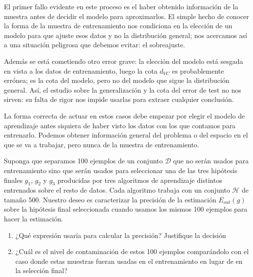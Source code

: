 \documentclass[a4paper, 11pt]{article}
\begin{document}
\begin{solucion}
      \begin{solucion}
        El primer fallo evidente en este proceso es el haber obtenido información de la muestra antes de decidir el modelo para aproximarlos. El simple hecho de conocer la forma de la muestra de entrenamiento nos condiciona en la elección de un modelo para que ajuste esos datos y no la distribución general; nos acercamos así a una situación peligrosa que debemos evitar: el sobreajuste.

        Además se está cometiendo otro error grave: la elección del modelo está sesgada en vista a los datos de entrenamiento, luego la cota $d_{VC}$ es probablemente errónea; es la cota del modelo, pero no del modelo que sigue la distribución general. Así, el estudio sobre la generalización y la cota del error de test no nos sirven: su falta de rigor nos impide usarlas para extraer cualquier conclusión.

        La forma correcta de actuar en estos casos debe empezar por elegir el modelo de aprendizaje antes siquiera de haber visto los datos con los que contamos para entrenarlo. Podemos obtener información general del problema o del espacio en el que se va a trabajar, pero nunca de la muestra de entrenamiento.
      \end{solucion}

      \begin{ejercicio}
          Suponga que separamos 100 ejemplos de un conjunto $\mathcal{D}$ que no serán usados para entrenamiento sino que serán usados para seleccionar una de las tres hipótesis finales $g_1$, $g_2$ y $g_3$ producidas por tres algoritmos de aprendizaje distintos entrenados sobre el resto de datos. Cada algoritmo trabaja con un conjunto $\mathcal{H}$ de tamaño 500. Nuestro deseo es caracterizar la precisión de la estimación $E_{out}(g)$ sobre la hipótesis final seleccionada cuando usamos los mismos 100 ejemplos para hacer la estimación.
          \begin{enumerate}
          \item ¿Qué expresión usaría para calcular la precisión? Justifique la decisión
          \item ¿Cuál es el nivel de contaminación de estos 100 ejemplos comparándolo con el caso donde estas muestras fueran usadas en el entrenamiento en lugar de en la selección final?
          \end{enumerate}
      \end{ejercicio}


\end{solucion}
\end{document}
